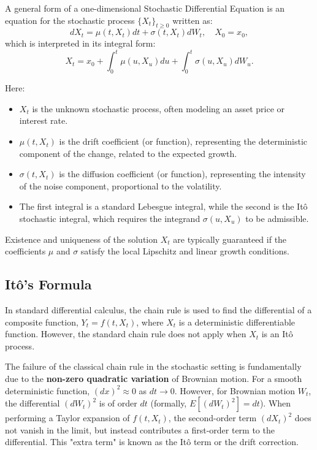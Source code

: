 \begin{definition}
A general form of a one-dimensional Stochastic Differential Equation is an equation for the stochastic process $\{X_t\}_{t \ge 0}$ written as:
\[
dX_t = \mu(t, X_t) dt + \sigma(t, X_t) dW_t, \quad X_0 = x_0,
\]
which is interpreted in its integral form:
\[
X_t = x_0 + \int_0^t \mu(u, X_u) du + \int_0^t \sigma(u, X_u) dW_u.
\]
\end{definition}
Here:
\begin{itemize}
    \item $X_t$ is the unknown stochastic process, often modeling an asset price or interest rate.
    \item $\mu(t, X_t)$ is the drift coefficient (or function), representing the deterministic component of the change, related to the expected growth.
    \item $\sigma(t, X_t)$ is the diffusion coefficient (or function), representing the intensity of the noise component, proportional to the volatility.
    \item The first integral is a standard Lebesgue integral, while the second is the Itô stochastic integral, which requires the integrand $\sigma(u, X_u)$ to be admissible.
\end{itemize}
Existence and uniqueness of the solution $X_t$ are typically guaranteed if the coefficients $\mu$ and $\sigma$ satisfy the local Lipschitz and linear growth conditions.
\subsection{Itô’s Formula}\label{sec:ito-formula}

In standard differential calculus, the chain rule is used to find the differential of a composite function, $Y_t = f(t, X_t)$, where $X_t$ is a deterministic differentiable function. However, the standard chain rule does not apply when $X_t$ is an Itô process.

The failure of the classical chain rule in the stochastic setting is fundamentally due to the \textbf{non-zero quadratic variation} of Brownian motion. For a smooth deterministic function, $(dx)^2 \approx 0$ as $dt \to 0$. However, for Brownian motion $W_t$, the differential $(dW_t)^2$ is of order $dt$ (formally, $E[(dW_t)^2] = dt$). When performing a Taylor expansion of $f(t, X_t)$, the second-order term $(dX_t)^2$ does not vanish in the limit, but instead contributes a first-order term to the differential. This "extra term" is known as the Itô term or the drift correction.
